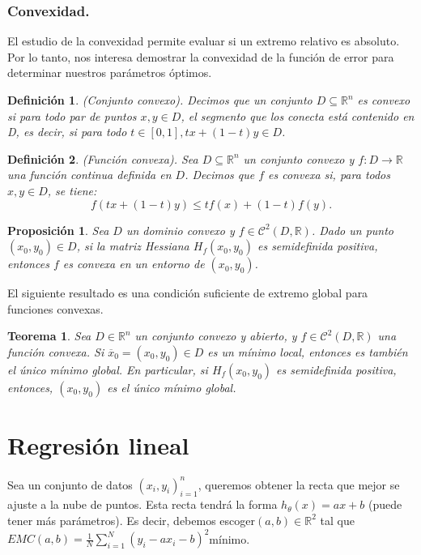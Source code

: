 \documentclass[a4paper,11pt]{article}
\newtheorem{theorem}{Teorema}
\newtheorem{proposition}{Proposición}
\newtheorem{definition}{Definición}
\begin{document}
\subsubsection{Convexidad.}

El estudio de la convexidad permite evaluar si un extremo relativo es absoluto. Por lo tanto, nos interesa demostrar la convexidad de la función de error para determinar nuestros parámetros óptimos.\\

\noindent
\begin{definition}(Conjunto convexo). Decimos que un conjunto $D\subseteq \mathbb{R}^n$
es convexo si para todo par de puntos $x,y \in D$, el segmento que los conecta está contenido en D, es decir, si para todo $t\in[0,1],tx+(1-t)y\in D$.
\end{definition}
\begin{definition} (Función convexa). Sea $D\subseteq \mathbb{R}^n$ un conjunto convexo y $f: D\rightarrow \mathbb{R}$ una función continua definida en $D$. Decimos que $f$ es convexa si, para todos $x,y\in D$, se tiene:
\begin{equation}
f(tx+(1-t)y) \leq tf(x)+(1-t)f(y).
\end{equation}
\end{definition}

\begin{proposition}
Sea $D$ un dominio convexo y $f\in\mathcal{C}^2(D,\mathbb{R})$. Dado un punto
$(x_0, y_0) \in D$, si la matriz Hessiana $H_f (x_0, y_0)$ es semidefinida positiva, entonces
$f$ es convexa en un entorno de $(x_0, y_0)$.
\end{proposition}
\noindent
El siguiente resultado es una condición suficiente de extremo global para funciones convexas.
\begin{theorem}
Sea $D\in\mathbb{R}^n$ un conjunto convexo y abierto, y $f\in\mathcal{C}^2(D,\mathbb{R})$ una función convexa. Si $\overline{x}_0=(x_0,y_0)\in D$ es un mínimo local, entonces es también el único mínimo global. En particular, si $H_f(x_0,y_0)$ es semidefinida positiva, entonces, $(x_0,y_0)$ es el único mínimo global.
\end{theorem}
\newpage
\section{Regresión lineal}

Sea un conjunto de datos $(x_i,y_i)^n_{i=1}$, queremos obtener la recta que mejor se ajuste a la nube de puntos. Esta recta tendrá la forma $h_\theta(x)= ax+b$ (puede tener  más parámetros). Es decir, debemos escoger$  (a,b)\in \mathbb{R}^2 $ tal que $EMC(a,b) = \frac{1}{N} \sum_{i=1}^{N}(y_{i}-ax_{i}-b)^2 $mínimo. \\
\end{document}
